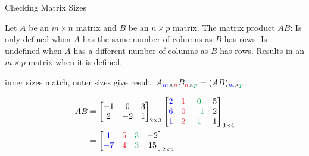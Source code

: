 \documentclass[xcolor=dvipsnames,aspectratio=169,t]{beamer}
\begin{document}
\begin{frame}{Checking Matrix Sizes}

\bbox
  Let $A$ be an $m \times n$ matrix and $B$ be an $n \times p$ matrix.  The matrix product $AB$:
  \bi
  \ii Is only defined when \alert{$A$ has the same number of columns as $B$ has rows}. 
  \ii Is undefined when $A$ has a different number of columns as $B$ has rows. 
  \ii Results in an $m \times p$ matrix when it is defined.
  \ei
\ebox

inner sizes match, outer sizes give result:  $A_{\colorb{m}\times \colorr{n}} B_{\colorr{n}\times \colorg{p}} = (AB)_{\colorb{m}\times \colorg{p}}$.
\vspace*{-1em}

\begin{align*}
AB &= \begin{bmatrix} -1 & 0 & 3\\ 2 & -2 & 1 \end{bmatrix}_{2\times 3} 
\begin{bmatrix} \colorb{2} & \colorr{1} & \colorg{0} & 5\\ \colorb{6} & \colorr{0} & \colorg{-1} & 2\\ \colorb{1} & \colorr{2} & \colorg{1} & 1 \end{bmatrix}_{3 \times 4} \\
& = \begin{bmatrix} \colorb{1} & \colorr{5} & \colorg{3} & -2 \\ \colorb{-7} & \colorr{4} & \colorg{3} & 15\end{bmatrix}_{2 \times 4} 
\end{align*}

\end{frame}
\end{document}
